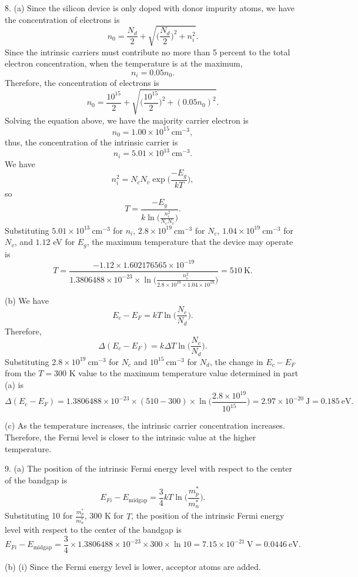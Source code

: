 \documentclass[a4paper]{article}
\begin{document}
8. (a) Since the silicon device is only doped with donor impurity atoms, we have the concentration of electrons is
$$n_0=\frac{N_d}{2}+\sqrt{\Big(\frac{N_d}{2}\Big)^2+n_i^2}.$$
Since the intrinsic carriers must contribute no more than 5 percent to the total electron concentration, when the temperature is at the maximum,
$$n_i=0.05n_0.$$
Therefore, the concentration of electrons is
$$n_0=\frac{10^{15}}{2}+\sqrt{\Big(\frac{10^{15}}{2}\Big)^2+(0.05n_0)^2}.$$
Solving the equation above, we have the majority carrier electron is
$$n_0=1.00\times10^{15}\ \text{cm}^{-3},$$
thus, the concentration of the intrinsic carrier is
$$n_i=5.01\times10^{13}\ \text{cm}^{-3}.$$
We have
$$n_i^2=N_cN_v\exp{\Big(\frac{-E_g}{kT}\Big)},$$
so
$$T=\frac{-E_g}{k\ln{\Big(\frac{n_i^2}{N_cN_v}\Big)}}.$$
Substituting $5.01\times10^{13}\ \text{cm}^{-3}$ for $n_i$, $2.8\times10^{19}\ \text{cm}^{-3}$ for $N_c$, $1.04\times10^{19}\ \text{cm}^{-3}$ for $N_v$, and $1.12$ eV for $E_g$, the maximum temperature that the device may operate is
$$T=\frac{-1.12\times1.602176565\times10^{-19}}{1.3806488\times10^{-23}\times\ln{\Big(\frac{n_i^2}{2.8\times10^{19}\times1.04\times10^{19}}\Big)}}=510\ \text{K}.$$

(b) We have
$$E_c-E_F=kT\ln{\Big(\frac{N_c}{N_d}\Big)}.$$
Therefore,
$$\Delta(E_c-E_F)=k\Delta T\ln{\Big(\frac{N_c}{N_d}\Big)}.$$
Substituting $2.8\times10^{19}\ \text{cm}^{-3}$ for $N_c$ and $10^{15}\ \text{cm}^{-3}$ for $N_d$, the change in $E_c-E_F$ from the $T=300$ K value to the maximum temperature value determined in part (a) is
$$\Delta(E_c-E_F)=1.3806488\times10^{-23}\times(510-300)\times\ln{\Big(\frac{2.8\times10^{19}}{10^{15}}\Big)}=2.97\times10^{-20}\ \text{J}=0.185\ \text{eV}.$$

(c) As the temperature increases, the intrinsic carrier concentration increases. Therefore, the Fermi level is $\boxed{\text{closer}}$ to the intrinsic value at the higher temperature.

9. (a) The position of the intrinsic Fermi energy level with respect to the center of the bandgap is
$$E_{Fi}-E_\text{midgap}=\frac{3}{4}kT\ln{\bigg(\frac{m_p^*}{m_n^*}\bigg)}.$$
Substituting 10 for $\frac{m_p^*}{m_n^*}$, 300 K for $T$, the position of the intrinsic Fermi energy level with respect to the center of the bandgap is
$$E_{Fi}-E_\text{midgap}=\frac{3}{4}\times1.3806488\times10^{-23}\times300\times\ln{10}=7.15\times10^{-21}\ \text{V}=0.0446\ \text{eV}.$$

(b) (i) Since the Fermi energy level is lower, $\boxed{\text{acceptor}}$ atoms are added.
\end{document}
